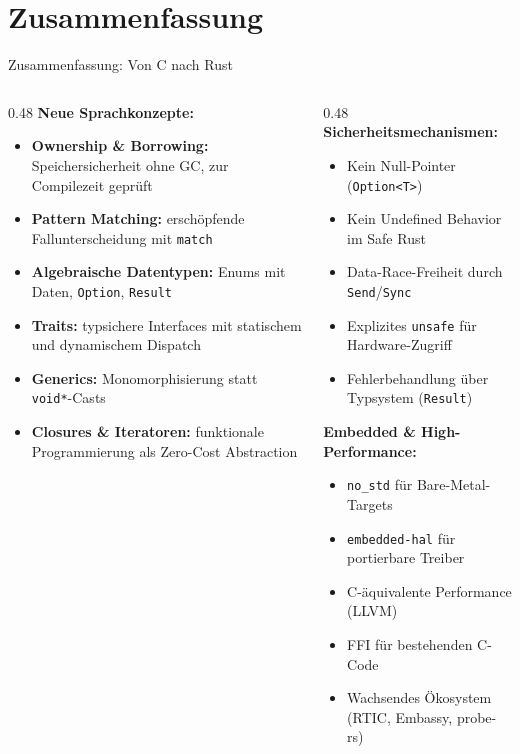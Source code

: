 \documentclass[%
  aspectratio=169,
  10pt
]{beamer}
\begin{document}
\section{Zusammenfassung}

\begin{frame}{Zusammenfassung: Von C nach Rust}
  \begin{columns}[T]
    \begin{column}{0.48\textwidth}
      \small
      \textbf{Neue Sprachkonzepte:}
      \begin{itemize}
        \item \textbf{Ownership \& Borrowing:} Speichersicherheit
              ohne GC, zur Compilezeit geprüft
        \item \textbf{Pattern Matching:} erschöpfende
              Fallunterscheidung mit \texttt{match}
        \item \textbf{Algebraische Datentypen:} Enums mit Daten,
              \texttt{Option}, \texttt{Result}
        \item \textbf{Traits:} typsichere Interfaces mit
              statischem und dynamischem Dispatch
        \item \textbf{Generics:} Monomorphisierung statt
              \texttt{void*}-Casts
        \item \textbf{Closures \& Iteratoren:} funktionale
              Programmierung als Zero-Cost Abstraction
      \end{itemize}
    \end{column}
    \begin{column}{0.48\textwidth}
      \small
      \textbf{Sicherheitsmechanismen:}
      \begin{itemize}
        \item Kein Null-Pointer (\texttt{Option<T>})
        \item Kein Undefined Behavior im Safe Rust
        \item Data-Race-Freiheit durch \texttt{Send}/\texttt{Sync}
        \item Explizites \texttt{unsafe} für Hardware-Zugriff
        \item Fehlerbehandlung über Typsystem (\texttt{Result})
      \end{itemize}
      \textbf{Embedded \& High-Performance:}
      \begin{itemize}
        \item \texttt{no\_std} für Bare-Metal-Targets
        \item \texttt{embedded-hal} für portierbare Treiber
        \item C-äquivalente Performance (LLVM)
        \item FFI für bestehenden C-Code
        \item Wachsendes Ökosystem (RTIC, Embassy, probe-rs)
      \end{itemize}
    \end{column}
  \end{columns}


\end{frame}
\end{document}
